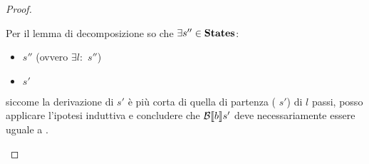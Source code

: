 {\begin{proof}
\begin{itemize}
             Per il lemma di decomposizione so che $\exists s''\in\mbox{\textbf{States}}$:
             \begin{itemize}
             \item {} \Rar{*} $s''$ (ovvero $\exists l:$
                 $s''$)
             \item {} \Rar{*} $s'$
             \end{itemize}
             siccome la derivazione di   $s'$ è più
             corta di quella di partenza ( 
             $s'$) di $l$ passi, posso applicare l'ipotesi
             induttiva e concludere che $\mathcal{B} \llbracket b \rrbracket s'$ deve necessariamente essere
             uguale a \semfalse.
             
            \end{itemize} 
           \end{proof}
         }
